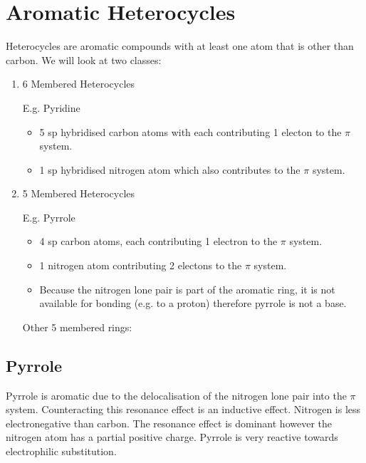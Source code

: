 \section{Aromatic Heterocycles}

Heterocycles are aromatic compounds with at least one atom that is other than carbon. We will look at two classes:

\begin{enumerate}

  \item 6 Membered Heterocycles

    E.g. Pyridine


    \begin{itemize}
      \item 5 sp hybridised carbon atoms with each contributing 1 electon to the $\pi$ system.
      \item 1 sp hybridised nitrogen atom which also contributes to the $\pi$ system.
    \end{itemize}

  \item 5 Membered Heterocycles

    E.g. Pyrrole


    \begin{itemize}
      \item 4 sp carbon atoms, each contributing 1 electron to the $\pi$ system.
      \item 1 nitrogen atom contributing 2 electons to the $\pi$ system.
      \item Because the nitrogen lone pair is part of the aromatic ring, it is not available for bonding (e.g. to a proton) therefore pyrrole is not a base.
    \end{itemize}

    Other 5 membered rings:


\end{enumerate}

\subsection{Pyrrole}

Pyrrole is aromatic due to the delocalisation of the nitrogen lone pair into the $\pi$system.
Counteracting this resonance effect is an inductive effect.
Nitrogen is less electronegative than carbon. The resonance effect is dominant however the nitrogen atom has a partial positive charge.
Pyrrole is very reactive towards electrophilic substitution.


